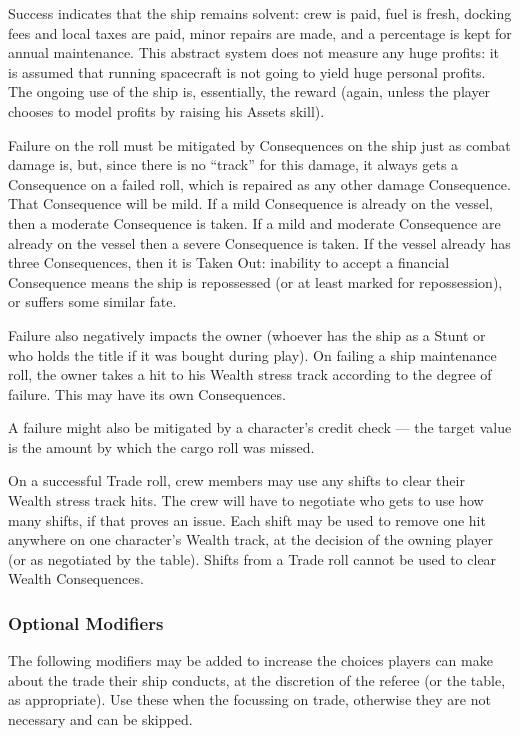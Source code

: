 Success indicates that the ship remains solvent: crew is paid, fuel is fresh, docking fees and local taxes are paid, minor repairs are made, and a percentage is kept for annual maintenance. This abstract system does not measure any huge profits: it is assumed that running spacecraft is not going to yield huge personal profits. The ongoing use of the ship is, essentially, the reward (again, unless the player chooses to model profits by raising his Assets skill).

Failure on the roll must be mitigated by Consequences on the ship just as combat damage is, but, since there is no ``track'' for this damage, it always gets a Consequence on a failed roll, which is repaired as any other damage Consequence. That Consequence will be mild. If a mild Consequence is already on the vessel, then a moderate Consequence is taken. If a mild and moderate Consequence are already on the vessel then a severe Consequence is taken. If the vessel already has three Consequences, then it is Taken Out: inability to accept a financial Consequence means the ship is repossessed (or at least marked for repossession), or suffers some similar fate.

Failure also negatively impacts the owner (whoever has the ship as a Stunt or who holds the title if it was bought during play). On failing a ship maintenance roll, the owner takes a hit to his Wealth stress track according to the degree of failure. This may have its own Consequences.

A failure might also be mitigated by a character's credit check --- the target value is the amount by which the cargo roll was missed.

On a successful Trade roll, crew members may use any shifts to clear their Wealth stress track hits. The crew will have to negotiate who gets to use how many shifts, if that proves an issue. Each shift may be used to remove one hit anywhere on one character's Wealth track, at the decision of the owning player (or as negotiated by the table). Shifts from a Trade roll cannot be used to clear Wealth Consequences.


\subsubsection{Optional Modifiers} \label{sec:optional-modifiers}

The following modifiers may be added to increase the choices players can make about the trade their ship conducts, at the discretion of the referee (or the table, as appropriate). Use these when the focussing on trade, otherwise they are not necessary and can be skipped.

